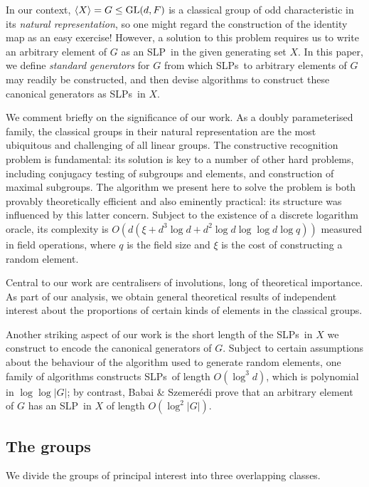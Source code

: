 \documentclass[12pt]{article}
\def\GL{{\rm GL}}
\def\Oh{O}  %
\def\SLP{{\rm SLP}}
\def\SLPs{{\rm SLPs}}
\begin{document}
In our context, $\langle X \rangle = G \leq \GL(d, F)$ is a 
classical group of odd 
characteristic in its {\it natural representation},
so one might regard the construction of the 
identity map as an easy exercise!
However, a solution to this problem requires
us to write an arbitrary element of $G$
as an \SLP\ in the given generating set $X$.
In this paper, we define {\it standard generators} 
for $G$ from which \SLPs\ to arbitrary
elements of $G$ may readily be constructed, and 
then devise algorithms to construct
these canonical generators as \SLPs\ in $X$.

We comment briefly on the significance of our work. As a doubly parameterised
family, the classical groups in their natural representation are the
most ubiquitous and challenging of all linear groups. 
The constructive recognition problem is fundamental:
its solution is key to a number of other hard problems,
including conjugacy testing of subgroups and elements, and 
construction of maximal subgroups.
The algorithm we present here to solve the problem
is both provably theoretically efficient 
and also eminently practical: its structure was influenced
by this latter concern. 
Subject to the existence of a discrete logarithm oracle,  
its complexity is 
$\Oh(d (\xi + d^3 \log d + d^2\log d \log\log d\log q))$ measured
in field operations, where $q$ is the field size
and $\xi$ is the cost of constructing a random element. 

Central to our work are centralisers of involutions, 
long of theoretical importance. As part of our analysis, 
we obtain general theoretical results 
of independent interest about the proportions of certain
kinds of elements in the classical groups. 

Another striking aspect of our work is the short length of 
the \SLPs\ in $X$ we construct to encode the canonical generators of $G$.
Subject to certain 
assumptions about the behaviour of the algorithm used to 
generate random elements, one family of algorithms 
constructs \SLPs\ of length $\Oh(\log^3 d)$, which is polynomial in
$\log\log|G|$; by contrast,
Babai \& Szemer{\'e}di \cite{BabaiSzemeredi84}
prove that an arbitrary element of
$G$ has an \SLP\ in $X$ of length $\Oh(\log^2|G|)$.

\subsection{The groups}
We divide the groups of principal interest into three overlapping classes.
\end{document}
